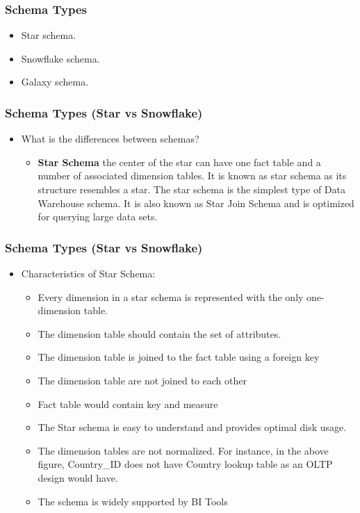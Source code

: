 \begin{frame}
\frametitle{Schema Types}
	\begin{itemize}[<+->]
		\item Star schema.
		\item Snowflake schema.
		\item Galaxy schema.
	\end{itemize}
	
\end{frame}
\begin{frame}
    \frametitle{Schema Types (Star vs Snowflake)}
	\begin{itemize}
		\item What is the differences between schemas?		    	
			\begin{itemize}
				\item \textbf{Star Schema} the center of the star can have one fact table and a number of associated dimension tables. It is known as star schema as its structure resembles a star. The star schema is the simplest type of Data Warehouse schema. It is also known as Star Join Schema and is optimized for querying large data sets.
			\end{itemize}
	\end{itemize}
\end{frame}
\begin{frame}
\frametitle{Schema Types (Star vs Snowflake)}
\begin{itemize}
	\item Characteristics of Star Schema:
	\begin{itemize}
		\item Every dimension in a star schema is represented with the only one-dimension table.
		\item The dimension table should contain the set of attributes.
		\item The dimension table is joined to the fact table using a foreign key
		\item The dimension table are not joined to each other
		\item Fact table would contain key and measure
		\item The Star schema is easy to understand and provides optimal disk usage.
		\item The dimension tables are not normalized. For instance, in the above figure, Country\_ID does not have Country lookup table as an OLTP design would have.
		\item The schema is widely supported by BI Tools
	\end{itemize}
\end{itemize}
\end{frame}

